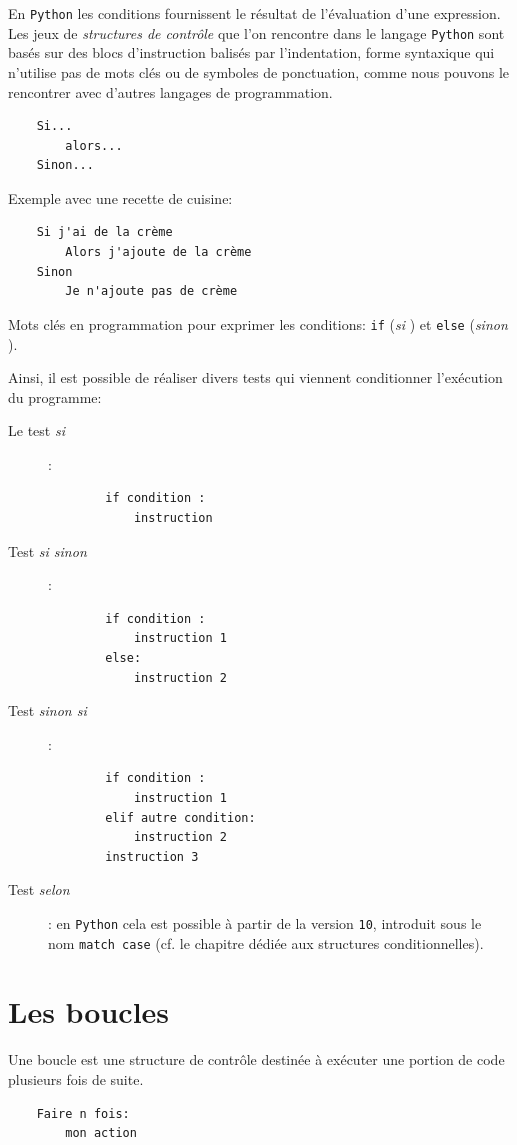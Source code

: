 \documentclass[a4paper,11pt]{book}
\begin{document}
En \texttt{Python} les conditions fournissent le résultat de l'évaluation d'une expression. Les jeux de \textit{structures de contrôle} que l'on rencontre dans le langage \texttt{Python} sont basés sur des blocs d'instruction balisés par l'indentation, forme syntaxique qui n'utilise pas de mots clés ou de symboles de ponctuation, comme nous pouvons le rencontrer avec d'autres langages de programmation.
\begin{verbatim}
    Si...
        alors...
    Sinon...
\end{verbatim}
\medskip

Exemple avec une recette de cuisine:
\begin{verbatim}
    Si j'ai de la crème
        Alors j'ajoute de la crème
    Sinon
        Je n'ajoute pas de crème
\end{verbatim}
\medskip

Mots clés en programmation pour exprimer les conditions: \texttt{if} (\og \textit{si} \fg{})  et \texttt{else} (\og \textit{sinon} \fg{}).
\medskip

Ainsi, il est possible de réaliser divers tests qui viennent conditionner l'exécution du programme:
\begin{description}
	\item[Le test \og \textit{si} \fg{}]:
	\begin{verbatim}
	    if condition : 
	        instruction
	\end{verbatim}
	\item[Test \og \textit{si sinon} \fg{}]:
	\begin{verbatim}
	    if condition : 
	        instruction 1
	    else:
	        instruction 2
	\end{verbatim}
	\item[Test \og \textit{sinon si} \fg{}]:
	\begin{verbatim}
	    if condition : 
	        instruction 1
	    elif autre condition:
	        instruction 2
	    instruction 3
	 \end{verbatim}
	 \item[Test \og \textit{selon} \fg{}]: en \texttt{Python} cela est possible à partir de la version \texttt{10}, introduit sous le nom \texttt{match case} (cf. le chapitre dédiée aux structures conditionnelles).
\end{description} 

\section{Les boucles}
Une boucle est une structure de contrôle destinée à exécuter une portion de code plusieurs fois de suite.
\begin{verbatim}
    Faire n fois:
        mon action
\end{verbatim}
\medskip
\end{document}
